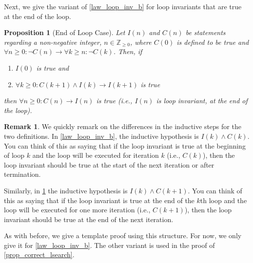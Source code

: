 \documentclass{article}
\theoremstyle{plain}
\newtheorem{proposition}[theorem]{Proposition}
\theoremstyle{definition}
\newtheorem{remark}[theorem]{Remark}
\newcommand{\ra}{\rightarrow}
\newcommand{\ZZ}{\mathbb{Z}_{\geq 0}}
\begin{document}
Next, we give the variant of \cref{law_loop_inv_b} for loop invariants that are true at the end of the loop.

\begin{proposition}[End of Loop Case]\label{law_loop_inv_e}
    Let \(I(n)\) and \(C(n)\) be statements regarding a non-negative integer, \(n \in \ZZ\), where \(C(0)\) is defined to be true and \(\forall n \geq 0: \lnot C(n) \ra \forall k \geq n : \lnot C(k)\). Then, if
    \begin{enumerate}
        \item \(I(0)\) is true and
        \item \(\forall k \geq 0 : C(k+1) \land I(k) \ra I(k+1)\) is true
    \end{enumerate}    
    then \(\forall n \geq 0 : C(n) \ra I(n)\) is true (i.e., \(I(n)\) is loop invariant, at the end of the loop).
\end{proposition}

\begin{remark}
    We quickly remark on the differences in the inductive steps for the two definitions. In \cref{law_loop_inv_b}, the inductive hypothesis is \(I(k) \land C(k)\). You can think of this as saying that if the loop invariant is true at the beginning of loop \(k\) and the loop will be executed for iteration \(k\) (i.e., \(C(k)\)), then the loop invariant should be true at the start of the next iteration or after termination.

    Similarly, in \cref{law_loop_inv_e} the inductive hypothesis is \(I(k) \land C(k+1)\). You can think of this as saying that if the loop invariant is true at the end of the \(k\)th loop and the loop will be executed for one more iteration (i.e., \(C(k+1)\)), then the loop invariant should be true at the end of the next iteration.
\end{remark}

As with before, we give a template proof using this structure. For now, we only give it for \cref{law_loop_inv_b}. The other variant is used in the proof of \cref{prop_correct_lsearch}.
\end{document}
